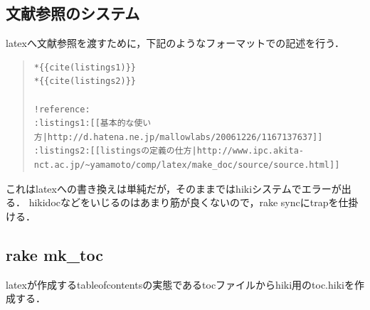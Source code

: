 \subsection{文献参照のシステム}
latexへ文献参照を渡すために，下記のようなフォーマットでの記述を行う．
\begin{quote}\begin{verbatim}
*{{cite(listings1)}}
*{{cite(listings2)}}

!reference:
:listings1:[[基本的な使い方|http://d.hatena.ne.jp/mallowlabs/20061226/1167137637]]
:listings2:[[listingsの定義の仕方|http://www.ipc.akita-nct.ac.jp/~yamamoto/comp/latex/make_doc/source/source.html]]
\end{verbatim}\end{quote}
これはlatexへの書き換えは単純だが，そのままではhikiシステムでエラーが出る．
hikidocなどをいじるのはあまり筋が良くないので，rake syncにtrapを仕掛ける．

\subsection{rake mk\_toc}
latexが作成するtableofcontentsの実態であるtocファイルからhiki用のtoc.hikiを作成する．

